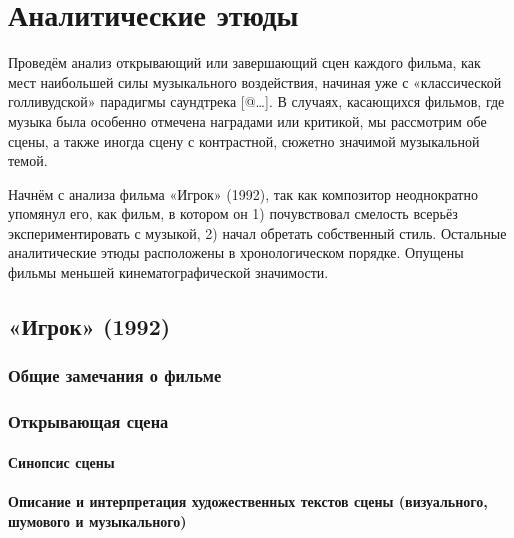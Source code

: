 \section{Аналитические этюды}\label{sec.SmEt}

Проведём анализ открывающий или завершающий сцен каждого фильма, как мест наибольшей силы музыкального воздействия, начиная уже с «классической голливудской» парадигмы саундтрека {[}@\ldots{}{]}.
В случаях, касающихся фильмов, где музыка была особенно отмечена наградами или критикой, мы рассмотрим обе сцены, а также иногда сцену с контрастной, сюжетно значимой музыкальной темой.

Начнём с анализа фильма «Игрок» (1992), так как композитор неоднократно упомянул его, как фильм, в котором он 1) почувствовал смелость всерьёз экспериментировать с музыкой, 2) начал обретать собственный стиль.
Остальные аналитические этюды расположены в хронологическом порядке.
Опущены фильмы меньшей кинематографической значимости.

\subsection{«Игрок» (1992)}\label{sec.SmEt.Pl}

\subsubsection{Общие замечания о фильме}\label{ux43eux431ux449ux438ux435-ux437ux430ux43cux435ux447ux430ux43dux438ux44f-ux43e-ux444ux438ux43bux44cux43cux435}

\subsubsection{Открывающая сцена}\label{ux43eux442ux43aux440ux44bux432ux430ux44eux449ux430ux44f-ux441ux446ux435ux43dux430}

\paragraph{Синопсис сцены}\label{ux441ux438ux43dux43eux43fux441ux438ux441-ux441ux446ux435ux43dux44b}

\paragraph{Описание и интерпретация художественных текстов сцены (визуального, шумового и музыкального)}\label{ux43eux43fux438ux441ux430ux43dux438ux435-ux438-ux438ux43dux442ux435ux440ux43fux440ux435ux442ux430ux446ux438ux44f-ux445ux443ux434ux43eux436ux435ux441ux442ux432ux435ux43dux43dux44bux445-ux442ux435ux43aux441ux442ux43eux432-ux441ux446ux435ux43dux44b-ux432ux438ux437ux443ux430ux43bux44cux43dux43eux433ux43e-ux448ux443ux43cux43eux432ux43eux433ux43e-ux438-ux43cux443ux437ux44bux43aux430ux43bux44cux43dux43eux433ux43e}

